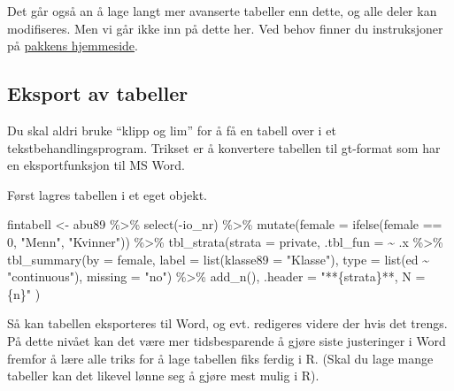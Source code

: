 \documentclass[
  norsk,
  letterpaper,
  DIV=11,
  numbers=noendperiod]{scrreprt}
\newenvironment{Shaded}{\begin{snugshade}}{\end{snugshade}}
\newcommand{\AttributeTok}[1]{\textcolor[rgb]{0.40,0.45,0.13}{#1}}
\newcommand{\DecValTok}[1]{\textcolor[rgb]{0.68,0.00,0.00}{#1}}
\newcommand{\FunctionTok}[1]{\textcolor[rgb]{0.28,0.35,0.67}{#1}}
\newcommand{\NormalTok}[1]{\textcolor[rgb]{0.00,0.23,0.31}{#1}}
\newcommand{\OtherTok}[1]{\textcolor[rgb]{0.00,0.23,0.31}{#1}}
\newcommand{\SpecialCharTok}[1]{\textcolor[rgb]{0.37,0.37,0.37}{#1}}
\newcommand{\StringTok}[1]{\textcolor[rgb]{0.13,0.47,0.30}{#1}}
\theoremstyle{definition}
\theoremstyle{remark}
\begin{document}
Det går også an å lage langt mer avanserte tabeller enn dette, og alle
deler kan modifiseres. Men vi går ikke inn på dette her. Ved behov
finner du instruksjoner på
\href{https://www.danieldsjoberg.com/gtsummary/index.html}{pakkens
hjemmeside}.

\subsection{Eksport av tabeller}\label{eksport-av-tabeller}

Du skal aldri bruke ``klipp og lim'' for å få en tabell over i et
tekstbehandlingsprogram. Trikset er å konvertere tabellen til gt-format
som har en eksportfunksjon til MS Word.

Først lagres tabellen i et eget objekt.

\begin{Shaded}
\begin{Highlighting}[]
\NormalTok{fintabell }\OtherTok{\textless{}{-}}\NormalTok{ abu89 }\SpecialCharTok{\%\textgreater{}\%} 
  \FunctionTok{select}\NormalTok{(}\SpecialCharTok{{-}}\NormalTok{io\_nr) }\SpecialCharTok{\%\textgreater{}\%} 
  \FunctionTok{mutate}\NormalTok{(}\AttributeTok{female =} \FunctionTok{ifelse}\NormalTok{(female }\SpecialCharTok{==} \DecValTok{0}\NormalTok{, }\StringTok{"Menn"}\NormalTok{, }\StringTok{"Kvinner"}\NormalTok{)) }\SpecialCharTok{\%\textgreater{}\%} 
  \FunctionTok{tbl\_strata}\NormalTok{(}\AttributeTok{strata =}\NormalTok{ private, }
             \AttributeTok{.tbl\_fun =} 
               \SpecialCharTok{\textasciitilde{}}\NormalTok{ .x }\SpecialCharTok{\%\textgreater{}\%}
               \FunctionTok{tbl\_summary}\NormalTok{(}\AttributeTok{by =}\NormalTok{ female, }
              \AttributeTok{label =} \FunctionTok{list}\NormalTok{(}\AttributeTok{klasse89 =} \StringTok{"Klasse"}\NormalTok{), }
              \AttributeTok{type =} \FunctionTok{list}\NormalTok{(ed }\SpecialCharTok{\textasciitilde{}} \StringTok{"continuous"}\NormalTok{), }
              \AttributeTok{missing =} \StringTok{"no"}\NormalTok{) }\SpecialCharTok{\%\textgreater{}\%}
               \FunctionTok{add\_n}\NormalTok{(),}
    \AttributeTok{.header =} \StringTok{"**\{strata\}**, N = \{n\}"}
\NormalTok{    )}
\end{Highlighting}
\end{Shaded}

Så kan tabellen eksporteres til Word, og evt. redigeres videre der hvis
det trengs. På dette nivået kan det være mer tidsbesparende å gjøre
siste justeringer i Word fremfor å lære alle triks for å lage tabellen
fiks ferdig i R. (Skal du lage mange tabeller kan det likevel lønne seg
å gjøre mest mulig i R).
\end{document}
